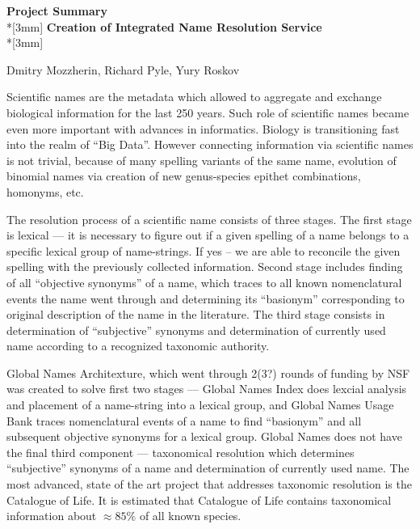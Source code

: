\documentclass{proposal}
\begin{document}
\begin{center}
{\Large{\bf Project Summary}}\\*[3mm]
{\bf Creation of Integrated Name Resolution Service} \\*[3mm]

Dmitry Mozzherin, Richard Pyle, Yury Roskov \\


\end{center}

Scientific names are the metadata which allowed to aggregate and exchange
biological information for the last 250 years. Such role of scientific names
became even more important with advances in informatics. Biology is
transitioning fast into the realm of ``Big Data''. However connecting
information via scientific names is not trivial, because of many spelling
variants of the same name, evolution of binomial names via creation of new
genus-species epithet combinations, homonyms, etc.


The resolution process of a scientific name consists of three stages. The
first stage is lexical --- it is necessary to figure out if a given spelling of
a name belongs to a specific lexical group of name-strings. If yes -- we are
able to reconcile the given spelling with the previously collected information.
Second stage includes finding of all ``objective synonyms'' of a name, which
traces to all known nomenclatural events the name went through and determining
its ``basionym'' corresponding to original description of the name in the
literature. The third stage consists in determination of ``subjective''
synonyms and determination of currently used name according to a recognized
taxonomic authority.

Global Names Architexture, which went through 2(3?) rounds of funding by NSF
was created to solve first two stages --- Global Names Index does lexcial
analysis and placement of a name-string into a lexical group, and Global Names
Usage Bank traces nomenclatural events of a name to find ``basionym'' and all
subsequent objective synonyms for a lexical group. Global Names does not
have the final third component --- taxonomical resolution which determines
``subjective'' synonyms of a name and determination of currently used name. The
most advanced, state of the art project that addresses taxonomic resolution is
the Catalogue of Life. It is estimated that Catalogue of Life contains
taxonomical information about $\approx85\%$ of all known species.
\end{document}
